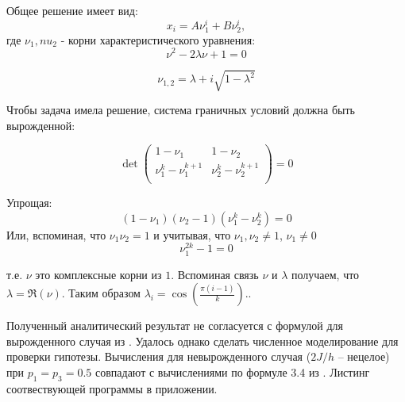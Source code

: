 Общее решение имеет вид:
\begin{equation}
	x_i = A\nu_1^i + B\nu_2^i,
\end{equation}
где $\nu_1, nu_2$ - корни характеристического уравнения:
\begin{equation}
	\nu^2 - 2\lambda \nu + 1 = 0
\end{equation}

\begin{equation}
	\nu_{1,2} = \lambda + i \sqrt{1 - \lambda^2}
\end{equation}

Чтобы задача имела решение, система граничных условий должна быть вырожденной:

\begin{equation}
	\det \begin{pmatrix} 
	1 - \nu_1 & 1 - \nu_2 \\
	\nu_1^k - \nu_1^{k+1} &  \nu_2^k - \nu_2^{k+1} \\
	\end{pmatrix} = 0
\end{equation}

Упрощая:
\begin{equation}
(1-\nu_1)(\nu_2-1)(\nu_1^k-\nu_2^k)=0
\end{equation}
Или, вспоминая, что $\nu_1 \nu_2 = 1$ и учитывая, что $\nu_1, \nu_2 \neq 1$, $\nu_1 \neq 0$
\begin{equation}
\nu_1^{2k}-1 = 0
\end{equation}


т.е. $\nu$ это комплексные корни из $1$. Вспоминая связь $\nu$ и $\lambda$ получаем, что $\lambda = \Re(\nu)$. Таким образом $\lambda_i = \cos(\frac{\pi (i-1)}{k}).$.

Полученный аналитический результат не согласуется с формулой для вырожденного случая из \cite{farhi1993correlation}.
Удалось однако сделать численное моделирование для проверки гипотезы. Вычисления для невырожденного случая ($2J/h$ -- нецелое) при $p_1 = p_3= 0.5$ совпадают с вычислениями по формуле 3.4 из \cite{farhi1993correlation}. Листинг соотвествующей программы в приложении.